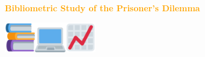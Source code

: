 \documentclass{beamer}
\begin{document}
\begin{frame}
    \begin{center}
    
    \end{center}
\end{frame}

\begin{frame}
    \begin{center}
    \textcolor{orange}{\large{\textbf{Bibliometric Study of the Prisoner's Dilemma}}} \vspace{1cm}
    
    \includegraphics[width=0.10\textwidth]{static/books.png}\hspace{2pt}\includegraphics[width=0.10\textwidth]{static/pc.png}\hspace{2pt}\includegraphics[width=0.10\textwidth]{static/chart.png}
    \end{center}
\end{frame}

\begin{frame}
    \begin{center}
    \hspace{1.15cm}
    \end{center}
\end{frame}

\begin{frame}
    \begin{center}
    
    \end{center}
\end{frame}

\begin{frame}
    \begin{center}
    
    \end{center}
\end{frame}
\end{document}
